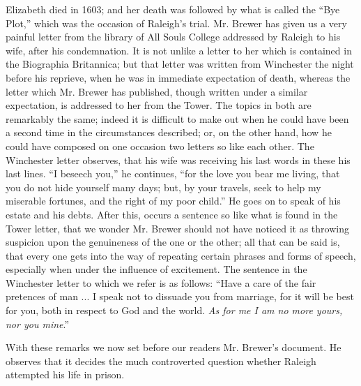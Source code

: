 Elizabeth died in 1603; and her death was followed
by what is called the ``Bye Plot,'' which was the occasion of Raleigh's
trial. Mr. Brewer has given us a very painful letter from the library of
All Souls College addressed by Raleigh to his wife, after his
condemnation. It is not unlike a letter to her which is contained in the
Biographia Britannica; but that letter was written from Winchester the
night before his reprieve, when he was in immediate expectation of
death, whereas the letter which Mr. Brewer has published, though written
under a similar expectation, is addressed to her from the Tower.
The topics in both are remarkably the same; indeed it is difficult to
make out when he could have been a second time in the circumstances
described; or, on the other hand, how he could have composed on one
occasion two letters so like each other. The Winchester letter observes,
that his wife was receiving his last words in these his last lines. ``I
beseech you,'' he continues, ``for the love you bear me living, that you
do not hide yourself many days; but, by your travels, seek to help my
miserable fortunes, and the right of my poor child.'' He goes on to speak
of his estate and his debts. After this, occurs a sentence so like what
is found in the Tower letter, that we wonder Mr. Brewer should not have
noticed it as throwing suspicion upon the genuineness of the one or the
other; all that can be said is, that every one gets into the way of
repeating certain phrases and forms of speech, especially when under the
influence of excitement. The sentence in the Winchester letter to which
we refer is as follows: ``Have a care of the fair pretences of man ... I
speak not to dissuade you from marriage, for it will be best for you,
both in respect to God and the world. \emph{As for me I am no more yours,
nor you mine}.''

With these remarks we now set before our readers
Mr. Brewer's document. He observes that it decides the much controverted
question whether Raleigh attempted his life in prison.

